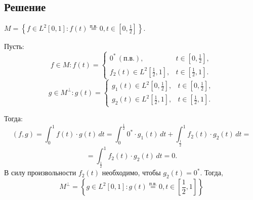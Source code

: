 \documentclass[14pt, a4paper, titlepage, fleqn]{extarticle}
\begin{document}
        \subsection{Решение}
        \( M = \left\{ f \in L^2 [ 0, 1 ]: f(t) \stackrel{\text{п.в.}}{=} 0, t \in \left[ 0, \frac{1}{2} \right] \right\} \).
        
        Пусть:
        \[
            f \in M: f(t) = \begin{cases}
                0^* \, (\text{п.в.}), & t \in \left[ 0, \frac{1}{2} \right], \\
                f_2(t) \in L^2\left[ \frac{1}{2}, 1 \right], & t\in \left[ \frac{1}{2}, 1 \right].
            \end{cases}
        \]
        \[
            g \in M^\perp: g(t) = \begin{cases}
                g_1(t) \in L^2\left[ 0, \frac{1}{2} \right], & t \in \left[ 0, \frac{1}{2} \right], \\
                g_2(t) \in L^2\left[ \frac{1}{2}, 1 \right], & t \in \left[ \frac{1}{2}, 1 \right].
            \end{cases}
        \]

        Тогда:
        \[
            (f, g) = \int_{0}^{1} f(t) \cdot g(t) \, dt = 
            \int_{0}^{\frac{1}{2}} 0^* \cdot g_1(t) \, dt + \int_{\frac{1}{2}}^{1} f_2(t) \cdot g_2(t) \, dt =
        \]
        \[
            = \int_{\frac{1}{2}}^{1} f_2(t) \cdot g_2(t) \, dt = 0.
        \]
        В силу произвольности \( f_2(t) \) необходимо, чтобы \( g_2(t) = 0^* \). Тогда,
        \[
            M^\perp = \left\{ g \in L^2 [ 0, 1 ]: g(t) \stackrel{\text{п.в.}}{=} 0, t \in \left[ \frac{1}{2}, 1 \right] \right\}
        \]
\end{document}
